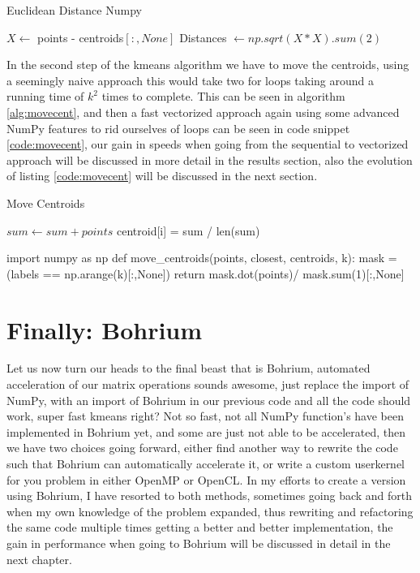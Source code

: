 \documentclass[12pt]{report}
\begin{document}
\begin{algorithm}
  \caption{Euclidean Distance Numpy}
  \label{alg:eucdist}
  \begin{algorithmic}[1]
    \State $X \gets $ points - centroids$[:,None]$
    \State Distances $\gets np.sqrt(X * X).sum(2)$
    \EndProcedure
  \end{algorithmic}
\end{algorithm}

In the second step of the kmeans algorithm we have to move the centroids, using a seemingly naive approach this would take two for loops taking around a running time of $k^2$ times to complete. This can be seen in algorithm \ref{alg:movecent}, and then a fast vectorized approach again using some advanced NumPy features to rid ourselves of loops can be seen in code snippet \ref{code:movecent}, our gain in speeds when going from the sequential to vectorized approach will be discussed in more detail in the results section, also the evolution of listing \ref{code:movecent} will be discussed in the next section.


\begin{algorithm}
  \caption{Move Centroids}
  \label{alg:movecent}
  \begin{algorithmic}[1]
    \State $sum \gets sum + points$
    \EndFor
    \State centroid[i] = sum / len(sum)
    \EndFor
    \EndProcedure
  \end{algorithmic}
\end{algorithm}



\begin{python}[caption={Numpy Vectorized version of move centroids}\label{code:movecent}]
import numpy as np
def move_centroids(points, closest, centroids, k):
    mask = (labels == np.arange(k)[:,None])
    return mask.dot(points)/ mask.sum(1)[:,None]
\end{python}

\newpage

\section{Finally: Bohrium}
\label{subsec:finally}
Let us now turn our heads to the final beast that is Bohrium, automated acceleration of our matrix operations sounds awesome, just replace the import of NumPy, with an import of Bohrium in our previous code and all the code should work, super fast kmeans right? Not so fast, not all NumPy function's have been implemented in Bohrium yet, and some are just not able to be accelerated, then we have two choices going forward, either find another way to rewrite the code such that Bohrium can automatically accelerate it, or write a custom userkernel for you problem in either OpenMP or OpenCL. In my efforts to create a version using Bohrium, I have resorted to both methods, sometimes going back and forth when my own knowledge of the problem expanded, thus rewriting and refactoring the same code multiple times getting a better and better implementation, the gain in performance when going to Bohrium will be discussed in detail in the next chapter.
\end{document}
